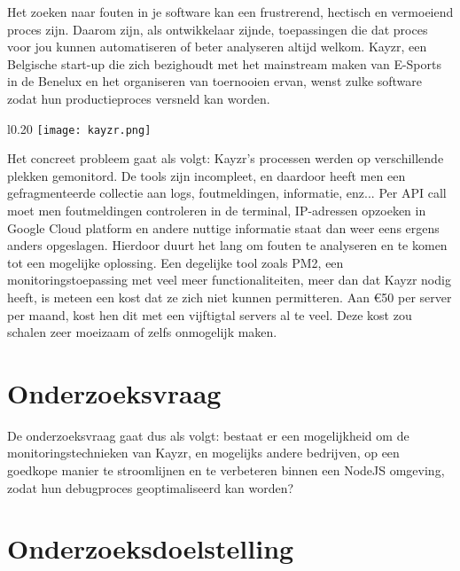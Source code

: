 Het zoeken naar fouten in je software kan een frustrerend, hectisch en vermoeiend proces zijn. Daarom zijn, als ontwikkelaar zijnde, toepassingen die dat proces voor jou kunnen automatiseren of beter analyseren altijd welkom. Kayzr, een Belgische start-up die zich bezighoudt met het mainstream maken van E-Sports in de Benelux en het organiseren van toernooien ervan, wenst zulke software zodat hun productieproces versneld kan worden. 
\begin{wrapfigure}{l}{0.20\textwidth}
	\texttt{[image: kayzr.png]}
\end{wrapfigure} Het concreet probleem gaat als volgt: Kayzr's processen werden op verschillende plekken gemonitord. De tools zijn incompleet, en daardoor heeft men een gefragmenteerde collectie aan logs, foutmeldingen, informatie, enz...  Per API call moet men foutmeldingen controleren in de terminal, IP-adressen opzoeken in Google Cloud platform en andere nuttige informatie staat dan weer eens ergens anders opgeslagen. Hierdoor duurt het lang om fouten te analyseren en te komen tot een mogelijke oplossing. Een degelijke tool zoals PM2, een monitoringstoepassing met veel meer functionaliteiten, meer dan dat Kayzr nodig heeft, is meteen een kost dat ze zich niet kunnen permitteren. Aan \euro 50 per server per maand, kost hen dit met een vijftigtal servers al te veel. Deze kost zou schalen zeer moeizaam of zelfs onmogelijk maken.

\section{Onderzoeksvraag}
\label{sec:onderzoeksvraag}

De onderzoeksvraag gaat dus als volgt: bestaat er een mogelijkheid om de monitoringstechnieken van Kayzr, en mogelijks andere bedrijven, op een goedkope manier te stroomlijnen en te verbeteren binnen een NodeJS omgeving, zodat hun debugproces geoptimaliseerd kan worden? 


\section{Onderzoeksdoelstelling}
\label{sec:onderzoeksdoelstelling}

